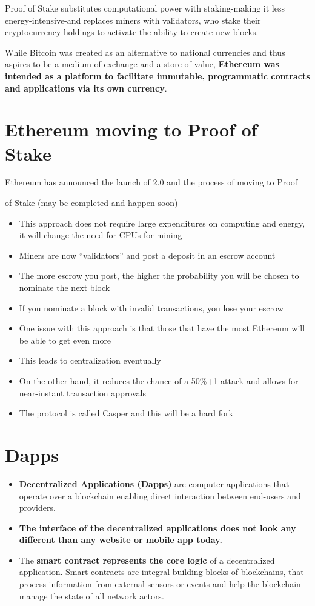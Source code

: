 Proof of Stake substitutes computational power with staking-making it less energy-intensive-and replaces miners with validators, who stake their cryptocurrency holdings to activate the ability to create new blocks.

While Bitcoin was created as an alternative to national currencies and thus aspires to be a medium of exchange and a store of value, \textbf{Ethereum was intended as a platform to facilitate immutable, programmatic contracts and applications via its own currency}.

\section{Ethereum moving to Proof of Stake}

Ethereum has announced the launch of 2.0 and the process of moving to Proof

of Stake (may be completed and happen soon)
\begin{itemize}
    \item This approach does not require large expenditures on computing and energy, it will change the need for CPUs for mining
    \item Miners are now ``validators'' and post a deposit in an escrow account
    \item The more escrow you post, the higher the probability you will be chosen to nominate the next block
    \item If you nominate a block with invalid transactions, you lose your escrow
    \item One issue with this approach is that those that have the most Ethereum will be able to get even more
    \item This leads to centralization eventually
    \item On the other hand, it reduces the chance of a 50\%+1 attack and allows for near-instant transaction approvals
    \item The protocol is called Casper and this will be a hard fork
\end{itemize}

\section{Dapps}

\begin{itemize}
    \item \textbf{Decentralized Applications (Dapps)} are computer applications that operate over a blockchain enabling direct interaction between end-users and providers.
    \item \textbf{The interface of the decentralized applications does not look any different than any website or mobile app today.}
    \item The \textbf{smart contract represents the core logic} of a decentralized application. Smart contracts are integral building blocks of blockchains, that process information from external sensors or events and help the blockchain manage the state of all network actors.
\end{itemize}

